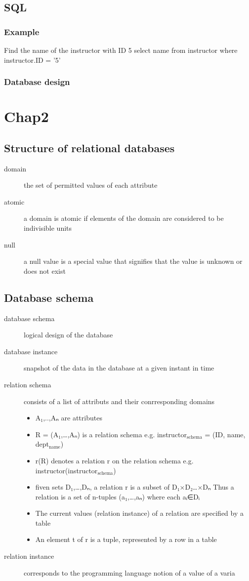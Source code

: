 \documentclass[11pt]{article}
\begin{document}
\subsection{SQL}
\label{sec-1-6}
\subsubsection{Example}
\label{sec-1-6-1}
Find the name of the instructor with ID 5
select name
from instructor
where instructor.ID = '5'
\subsubsection{Database design}
\label{sec-1-6-2}
\section{Chap2}
\label{sec-2}
\subsection{Structure of relational databases}
\label{sec-2-1}
\begin{description}
\item[{domain}] the set of permitted values of each attribute
\item[{atomic}] a domain is atomic if elements of the
domain are considered to be indivisible units
\item[{null}] a null value is a special value that signifies that
the value is unknown or does not exist
\end{description}
\subsection{Database schema}
\label{sec-2-2}
\begin{description}
\item[{database schema}] logical design of the database
\item[{database instance}] snapshot of the data in the database
at a given instant in time
\item[{relation schema}] consists of a list of attributs and their
conrresponding domains
\begin{itemize}
\item A₁,..,Aₙ are attributes
\item R = (A₁,\ldots{},Aₙ) is a relation schema
e.g. instructor$_{\text{schema}}$ = (ID, name, dept$_{\text{name}}$)
\item r(R) denotes a relation r on the relation schema
e.g. instructor(instructor$_{\text{schema}}$)
\item fiven sets D₁,\ldots{},Dₙ, a relation r is a subset of
D₁×D₂\ldots{}×Dₙ
Thus a relation is a set of n-tuples (a₁,\ldots{},aₙ) where each
aᵢ∈Dᵢ
\item The current values (relation instance) of a relation are specified
by a table
\item An element t of r is a tuple, represented by a row in a table
\end{itemize}

\item[{relation instance}] corresponds to the programming language notion
of a value of a varia
\end{description}
\end{document}
